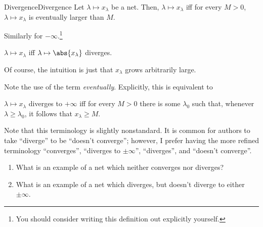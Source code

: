 \begin{dfn}{Divergence}{Divergence}
Let $\lambda \mapsto x_\lambda$ be a net.  Then, $\lambda \mapsto x_\lambda$  iff for every $M>0$, $\lambda \mapsto x_{\lambda}$ is eventually larger than $M$.

Similarly for $-\infty$.\footnote{You should consider writing this definition out explicitly yourself.}

$\lambda \mapsto x_\lambda$  iff $\lambda \mapsto \abs{x_{\lambda}}$ diverges.
\begin{rmk}
Of course, the intuition is just that $x_\lambda$ grows arbitrarily large.
\end{rmk}
\begin{rmk}
Note the use of the term \emph{eventually}.  Explicitly, this is equivalent to
\begin{textequation}
$\lambda \mapsto x_{\lambda}$ diverges to $+\infty$ iff for every $M>0$ there is some $\lambda _0$ such that, whenever $\lambda \geq \lambda _0$, it follows that $x_{\lambda}\geq M$.
\end{textequation}
\end{rmk}
\begin{rmk}
Note that this terminology is slightly nonstandard.  It is common for authors to take ``diverge'' to be ``doesn't converge''; however, I prefer having the more refined terminology ``converges'', ``diverges to $\pm \infty$'', ``diverges'', and ``doesn't converge''.
\end{rmk}
\end{dfn}
\begin{exr}{}{}
\begin{enumerate}
\item What is an example of a net which neither converges nor diverges?
\item What is an example of a net which diverges, but doesn't diverge to either $\pm \infty$.
\end{enumerate}
\end{exr}

